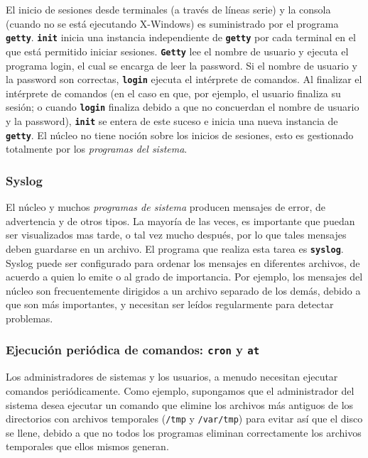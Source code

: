 \documentclass[12pt]{article}
\begin{document}
\begin{}
 El inicio de sesiones desde terminales (a través de líneas serie) y la
consola (cuando no se está ejecutando X-Windows) es suministrado por el programa
\texttt{\textbf{getty}}. \texttt{\textbf{init}} inicia una instancia
independiente de \texttt{\textbf{getty}} por cada terminal en el que está permitido iniciar
sesiones. \texttt{\textbf{Getty}} lee el nombre de usuario y ejecuta el
programa login, el cual se encarga de leer la password. Si el nombre de usuario
y la password son correctas, \texttt{\textbf{login}} ejecuta el intérprete de
comandos.  Al finalizar el intérprete de comandos (en el caso en que, por
ejemplo, el usuario finaliza su sesión; o cuando \texttt{\textbf{login}} finaliza debido a que no
concuerdan el nombre de usuario y la password), \texttt{\textbf{init}} se
entera de este suceso e inicia una nueva instancia de \texttt{\textbf{getty}}.
El núcleo no tiene noción sobre los inicios de sesiones, esto es gestionado
totalmente por los \textit{programas del sistema}.  



\subsubsection{ Syslog}

 El núcleo y muchos \textit{programas de sistema} producen
mensajes de error, de advertencia y de otros tipos. La mayoría de las veces, es
importante que puedan ser visualizados mas tarde, o tal vez mucho después, por
lo que tales mensajes deben guardarse en un archivo. El programa que realiza
esta tarea es \texttt{\textbf{syslog}}. Syslog puede ser configurado para
ordenar los mensajes en diferentes archivos, de acuerdo a quien lo emite o al
grado de importancia.  Por ejemplo, los mensajes del núcleo son frecuentemente
dirigidos a un archivo separado de los demás, debido a que son más importantes,
y necesitan ser leídos regularmente para detectar problemas.  



\subsubsection{ Ejecución periódica de comandos: \texttt{\textbf{cron}} y
\texttt{\textbf{at}}}

 Los administradores de sistemas y los usuarios, a menudo necesitan
ejecutar comandos periódicamente. Como ejemplo, supongamos que el administrador
del sistema desea ejecutar un comando que elimine los archivos más antiguos de
los directorios con archivos temporales (\texttt{/tmp} y
\texttt{/var/tmp}) para evitar así que el disco se llene, debido a
que no todos los programas eliminan correctamente los archivos temporales que
ellos mismos generan.  


\end{}
\end{document}
